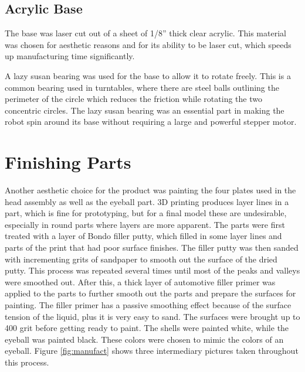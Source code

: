 \subsection{Acrylic Base}
The base was laser cut out of a sheet of 1/8'' thick clear acrylic. This material was chosen for aesthetic reasons and for its ability to be laser cut, which speeds up manufacturing time significantly.

A lazy susan bearing was used for the base to allow it to rotate freely. This is a common bearing used in turntables, where there are steel balls outlining the perimeter of the circle which reduces the friction while rotating the two concentric circles. The lazy susan bearing was an essential part in making the robot spin around its base without requiring a large and powerful stepper motor.

\section{Finishing Parts}
Another aesthetic choice for the product was painting the four plates used in the head assembly as well as the eyeball part. 3D printing produces layer lines in a part, which is fine for prototyping, but for a final model these are undesirable, especially in round parts where layers are more apparent. The parts were first treated with a layer of Bondo filler putty, which filled in some layer lines and parts of the print that had poor surface finishes. The filler putty was then sanded with incrementing grits of sandpaper to smooth out the surface of the dried putty. This process was repeated several times until most of the peaks and valleys were smoothed out. After this, a thick layer of automotive filler primer was applied to the parts to further smooth out the parts and prepare the surfaces for painting. The filler primer has a passive smoothing effect because of the surface tension of the liquid, plus it is very easy to sand. The surfaces were brought up to 400 grit before getting ready to paint. The shells were painted white, while the eyeball was painted black. These colors were chosen to mimic the colors of an eyeball. Figure \ref{fig:manufact} shows three intermediary pictures taken throughout this process.
